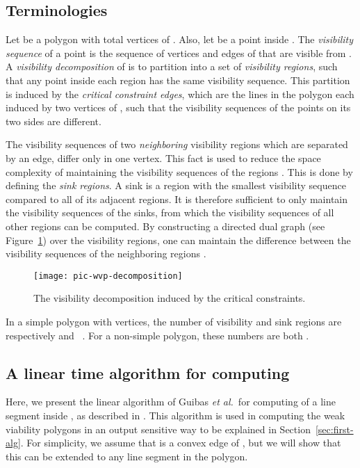 \documentclass[5p]{elsarticle}
\begin{document}
\subsection{Terminologies} \label{sec:pre:decompos}
Let  be a polygon with total vertices of . Also, let  be 
a point inside .
The {\em visibility sequence} of a point  is 
the sequence of vertices and edges of  that are visible from . 
A {\em visibility decomposition} of  is to partition  into a set of 
{\em visibility regions}, such that any point inside each region has the same visibility sequence. 
This partition is induced by 
the {\em critical constraint edges},
which are the lines in the polygon each induced by two vertices of ,
such that the visibility sequences of the points
on its two sides are different.
	

The visibility sequences of two  {\em neighboring} visibility regions which are separated by an edge, 
differ only in one vertex.
This fact is used to reduce the space complexity of maintaining the 
visibility sequences of the regions \cite{bose}.
This is done by defining the {\em sink regions}. 
A sink is a region with the smallest visibility sequence compared to all 
of its adjacent regions.
It is therefore sufficient to only maintain the visibility sequences of the sinks,
from which the
visibility sequences of all other regions can be computed.
By constructing a directed dual graph (see Figure~\ref{fig:f2}) over 
the visibility regions, one can maintain the difference between the visibility sequences of 
the neighboring regions \cite{bose}.




\begin{figure}[h]
  \centering
  \texttt{[image: pic-wvp-decomposition]} 
  \caption{The visibility decomposition induced by the critical constraints.}
  \label{fig:f2}
\end{figure}


In a simple polygon with  vertices, the number of visibility
and sink regions are respectively  and ~\cite{bose}.
For a non-simple polygon, these numbers are both  \cite{zarei}.



\subsection{A linear time algorithm for computing } \label{sec:guibas}
Here, we present the linear algorithm of Guibas {\em et al.}\ for computing
 of a line segment  inside , 
as described in \cite{ghosh}.
This algorithm is used in computing the weak viability polygons in an output sensitive way 
to be explained in Section~\ref{sec:first-alg}.
For simplicity, we assume that  is a convex edge of ,
but we will show that this can be extended to any line segment in the polygon.
\end{document}

